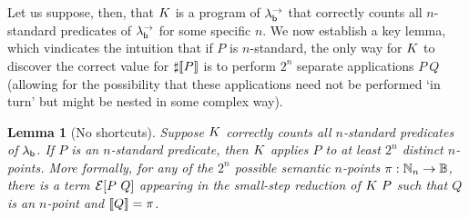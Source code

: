 \documentclass[12pt,phd,lfcs,twoside,openright,logo,leftchapter,normalheadings]{infthesis}
\theoremstyle{plain}
\newtheorem{lemma}[theorem]{Lemma}
\theoremstyle{definition}
\begin{document}
Let us suppose, then, that $K$ is a program of $\lambda^\rightarrow_{\mathsf{b}}$ that correctly counts
all $n$-standard predicates of $\lambda^\rightarrow_{\mathsf{b}}$ for some specific $n$.
We now establish a key lemma, which vindicates the \naive intuition
that if $P$ is $n$-standard, the only way for $K$ to discover the correct
value for $\sharp \val{P}$ is to perform $2^n$ separate applications $P~Q$
(allowing for the possibility that these applications need not
be performed `in turn' but might be nested in some complex way).

\begin{lemma}[No shortcuts]\label{lem:no-shortcuts}
  Suppose $K$ correctly counts all $n$-standard predicates of $\lambda_{\mathsf{b}}$.
  If $P$ is an $n$-standard predicate,
  then $K$ applies $P$ to at least $2^n$ distinct $n$-points.
  More formally, for any of the $2^n$ possible semantic $n$-points
  $\pi : \mathbb{N}_n \to \mathbb{B}$, there is a term $\mathcal{E}[P~Q]$ appearing in the
  small-step reduction of $K~P$ such that $Q$ is an $n$-point and $\llbracket Q \rrbracket = \pi$.
\end{lemma}
\end{document}
